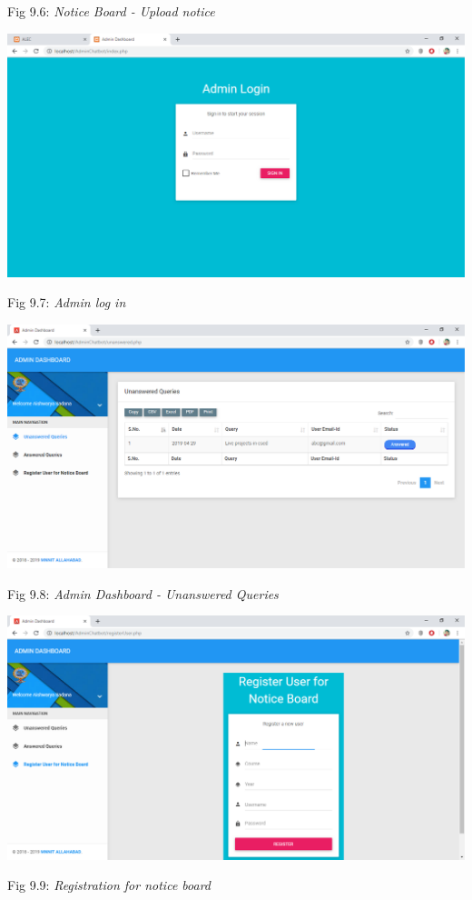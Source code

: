 \documentclass{mnnit}
\begin{document}
\begin{center}
Fig 9.6: \emph{Notice Board - Upload notice}
\end{center}
\includegraphics[width=\textwidth]{images/s7.png}
\begin{center}
Fig 9.7: \emph{Admin log in}\\
\end{center}
\includegraphics[width=\textwidth]{images/s8.png}
\begin{center}
Fig 9.8: \emph{Admin Dashboard - Unanswered Queries}\\
\end{center}
\includegraphics[width=\textwidth]{images/s9.png}
\begin{center}
Fig 9.9: \emph{Registration for notice board}\\
\end{center}
\end{document}
